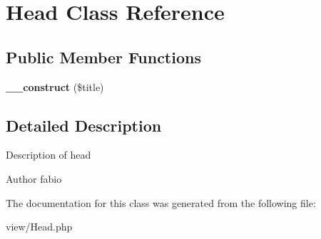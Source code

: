 \hypertarget{classHead}{\section{Head Class Reference}
\label{classHead}
}
\subsection*{Public Member Functions}
\begin{DoxyCompactItemize}
\item 
\hypertarget{classHead_aca4d8364a9b27cee6a544ed11ba6f6fe}{{\bfseries \+\_\+\+\_\+construct} (\$title)}\label{classHead_aca4d8364a9b27cee6a544ed11ba6f6fe}

\end{DoxyCompactItemize}


\subsection{Detailed Description}
Description of head

\begin{DoxyAuthor}{Author}
fabio 
\end{DoxyAuthor}


The documentation for this class was generated from the following file\+:\begin{DoxyCompactItemize}
\item 
view/Head.\+php\end{DoxyCompactItemize}
